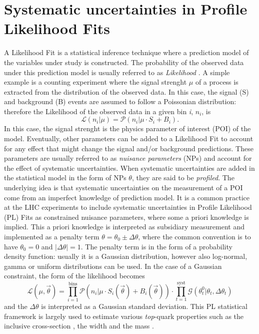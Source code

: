 \documentclass[12pt]{article}
\begin{document}
\section{Systematic uncertainties in Profile Likelihood Fits}
A Likelihood Fit is a statistical inference technique where a prediction model of the variables under study is constructed. The probability of the observed data under this prediction model is usually referred to as \emph{Likelihood} \cite{kCranmer}.
A simple example is a counting experiment where the signal strenght $\mu$ of a process is extracted from the distribution of the observed data. In this case, the signal (S) and background (B) events are assumed to follow a Poissonian distribution: therefore the Likelihood of the observed data in a given bin \emph{i}, $n_i$, is
\begin{equation}
\mathcal{L}(n_i|\mu) = \mathcal{P}(n_i|\mu\cdot S_i+B_i).
\end{equation}
In this case, the signal strenght is the physics parameter of interest (POI) of the model. Eventually, other parameters can be added to a Likelihood Fit to account for any effect that might change the signal and/or background predictions. 
These parameters are usually referred to as \emph{nuisance parameters} (NPs) and account for the effect of systematic uncertainties. When systematic uncertainties are added in the statistical model in the form of NPs $\theta$, they are said to be \emph{profiled}. The underlying idea is that systematic uncertainties on the measurement of a POI come from an imperfect knowledge of prediction model. It is a common practice at the LHC experiments to include systematic uncertainties in Profile Likelihood (PL) Fits as constrained nuisance parameters, where some a priori knowledge is implied. This a priori knowledge is interpreted as subsidiary measurement and implemented as a penalty term $\theta = \theta_0\pm\Delta\theta$, where the common convention is to have $\theta_0 = 0$ and $|\Delta\theta| =1$. The penalty term is in the form of a probability density function: usually it is a Gaussian distribution, however also log-normal, gamma or uniform distributions can be used. 
In the case of a Gaussian constraint, the form of the likelihood becomes 
\begin{equation}
\mathcal{L}(\mu,\vec{\theta}) = \displaystyle\prod_{i=1}^{\mathrm{bins}}\mathcal{P}(n_i|\mu\cdot S_i(\vec{\theta})+B_i(\vec{\theta}))\cdot\displaystyle\prod_{t=1}^{\mathrm{syst}}\mathcal{G}(\theta_t^0|\theta_t,\Delta\theta_t)
\end{equation}
and the $\Delta\theta$ is interpreted as a Gaussian standard deviation.
This PL statistical framework is largely used to estimate various \emph{top}-quark properties such as the inclusive cross-section \cite{Aad_2020,CMS_inclusive}, the width \cite{ATLAS:2019onj} and the mass \cite{CMS_inclusive}.
\end{document}
